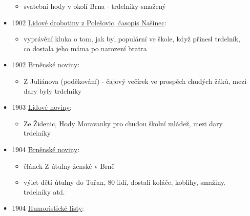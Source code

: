 \begin{itemize}
  \begin{itemize}
  \tightlist
  \item
    svatební hody v okolí Brna - trdelníky smažený
  \end{itemize}
\item
  1902
  \href{https://ceskadigitalniknihovna.cz/view/uuid:51ede477-8259-11e0-b92b-0050569d679d?page=uuid\%3A540811e9-8259-11e0-b92b-0050569d679d&fulltext=trdeln\%C3\%ADk\%20OR\%20trdeln\%C3\%ADky\%20OR\%20trdeln\%C3\%ADk\%C5\%AF&source=mzk}{Lidové
  drobotiny z Polešovic, časopis Našinec}:

  \begin{itemize}
  \tightlist
  \item
    vyprávění kluka o tom, jak byl populární ve škole, když přinesl
    trdelník, co dostala jeho máma po narození bratra
  \end{itemize}
\item
  1902
  \href{https://ceskadigitalniknihovna.cz/view/uuid:b0836ae0-7a03-11e3-ae4b-001018b5eb5c?page=uuid\%3A5bf570c0-7bd1-11e3-ae4b-001018b5eb5c&fulltext=trdeln\%C3\%ADk\%20OR\%20trdeln\%C3\%ADky\%20OR\%20trdeln\%C3\%ADk\%C5\%AF&source=mzk}{Brněnské
  noviny}:

  \begin{itemize}
  \tightlist
  \item
    Z Juliánova (poděkování) - čajový večírek ve prospěch chudých žáků,
    mezi dary byly trdelníky
  \end{itemize}
\item
  1903
  \href{https://www.digitalniknihovna.cz/vkol/uuid/uuid:b799eafc-435d-11dd-b505-00145e5790ea}{Lidové
  noviny}:

  \begin{itemize}
  \tightlist
  \item
    Ze Židenic, Hody Moravanky pro chudou školní mládež, mezi dary
    trdelníky
  \end{itemize}
\item
  1904
  \href{https://ceskadigitalniknihovna.cz/view/uuid:62df2c30-8367-11e3-a606-005056827e51?page=uuid\%3A3bd12fb0-86e3-11e3-b6b2-005056822549&fulltext=trdeln\%C3\%ADk\%20OR\%20trdeln\%C3\%ADky\%20OR\%20trdeln\%C3\%ADk\%C5\%AF&source=mzk}{Brněnské
  noviny}:

  \begin{itemize}
  \tightlist
  \item
    článek Z útulny ženské v Brně
  \item
    výlet dětí útulny do Tuřan, 80 lidí, dostali koláče, koblihy,
    smažiny, trdelníky atd.
  \end{itemize}
\item
  1904
  \href{https://ceskadigitalniknihovna.cz/uuid/uuid:e6cbfaf4-435d-11dd-b505-00145e5790ea}{Humoristické
  listy}:


\end{itemize}
